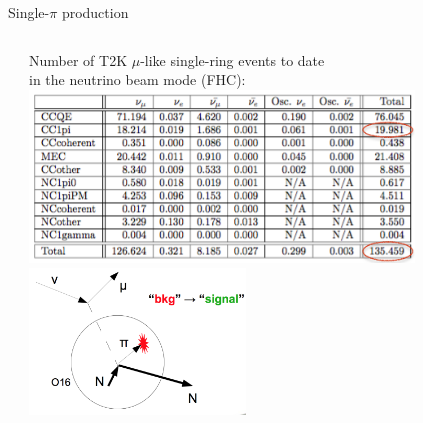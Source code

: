 \begin{frame}{Single-$\pi$ production}
\begin{columns}
\begin{column}{0.38\textwidth}
\begin{center}
      \end{center}
    \end{column}
    \begin{column}{0.62\textwidth}
     \begin{center}
        {\scriptsize \color{cadmiumred}
          Number of T2K $\mu$-like single-ring events to date\\
          in the neutrino beam mode (FHC):\\
        }
        \includegraphics[width=0.80\textwidth]{./images/nuint/other/T2KFHC1RmuRun1to7_annotated}\\
        \includegraphics[width=0.45\textwidth]{./images/nuint/feyn/single_pi_bkg_to_signal}\\
     \end{center}
    \end{column}
  \end{columns}

\end{frame}

